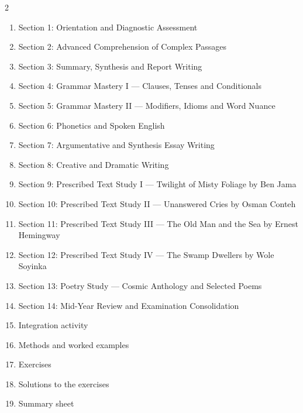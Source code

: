 \documentclass[11pt]{article}
\begin{document}
\begin{sommaire}
\begin{multicols}{2}
\begin{enumerate}
\item Section 1: Orientation and Diagnostic Assessment
\item Section 2: Advanced Comprehension of Complex Passages
\item Section 3: Summary, Synthesis and Report Writing
\item Section 4: Grammar Mastery I — Clauses, Tenses and Conditionals
\item Section 5: Grammar Mastery II — Modifiers, Idioms and Word Nuance
\item Section 6: Phonetics and Spoken English
\item Section 7: Argumentative and Synthesis Essay Writing
\item Section 8: Creative and Dramatic Writing
\item Section 9: Prescribed Text Study I — Twilight of Misty Foliage by Ben Jama
\item Section 10: Prescribed Text Study II — Unanswered Cries by Osman Conteh
\item Section 11: Prescribed Text Study III — The Old Man and the Sea by Ernest Hemingway
\item Section 12: Prescribed Text Study IV — The Swamp Dwellers by Wole Soyinka
\item Section 13: Poetry Study — Cosmic Anthology and Selected Poems
\item Section 14: Mid-Year Review and Examination Consolidation
\item Integration activity
\item Methods and worked examples
\item Exercises
\item Solutions to the exercises
\item Summary sheet
\end{enumerate}
\end{multicols}
\end{sommaire}
\end{document}
